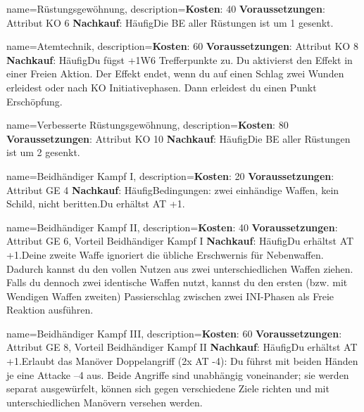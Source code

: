 {
    name={Rüstungsgewöhnung},
    description={\textbf{Kosten}: 40 \textbf{Voraussetzungen}: Attribut KO 6 \textbf{Nachkauf}: Häufig\newline Die BE aller Rüstungen ist um 1 gesenkt.}
}


{
    name={Atemtechnik},
    description={\textbf{Kosten}: 60 \textbf{Voraussetzungen}: Attribut KO 8 \textbf{Nachkauf}: Häufig\newline Du fügst +1W6 Trefferpunkte zu. Du aktivierst den Effekt in einer Freien Aktion. Der Effekt endet, wenn du auf einen Schlag zwei Wunden erleidest oder nach KO Initiativephasen. Dann erleidest du einen Punkt Erschöpfung.}
}


{
    name={Verbesserte Rüstungsgewöhnung},
    description={\textbf{Kosten}: 80 \textbf{Voraussetzungen}: Attribut KO 10 \textbf{Nachkauf}: Häufig\newline Die BE aller Rüstungen ist um 2 gesenkt.}
}


{
    name={Beidhändiger Kampf I},
    description={\textbf{Kosten}: 20 \textbf{Voraussetzungen}: Attribut GE 4 \textbf{Nachkauf}: Häufig\newline Bedingungen: zwei einhändige Waffen, kein Schild, nicht beritten.\newline Du erhältst AT +1.}
}


{
    name={Beidhändiger Kampf II},
    description={\textbf{Kosten}: 40 \textbf{Voraussetzungen}: Attribut GE 6, Vorteil Beidhändiger Kampf I \textbf{Nachkauf}: Häufig\newline Du erhältst AT +1.\newline Deine zweite Waffe ignoriert die übliche Erschwernis für Nebenwaffen. Dadurch kannst du den vollen Nutzen aus zwei unterschiedlichen Waffen ziehen. Falls du dennoch zwei identische Waffen nutzt, kannst du den ersten (bzw. mit Wendigen Waffen zweiten) Passierschlag zwischen zwei INI-Phasen als Freie Reaktion ausführen.}
}


{
    name={Beidhändiger Kampf III},
    description={\textbf{Kosten}: 60 \textbf{Voraussetzungen}: Attribut GE 8, Vorteil Beidhändiger Kampf II \textbf{Nachkauf}: Häufig\newline Du erhältst AT +1.\newline Erlaubt das Manöver Doppelangriff (2x AT -4): Du führst mit beiden Händen je eine Attacke –4 aus. Beide Angriffe sind unabhängig voneinander; sie werden separat ausgewürfelt, können sich gegen verschiedene Ziele richten und mit unterschiedlichen Manövern versehen werden.}
}


